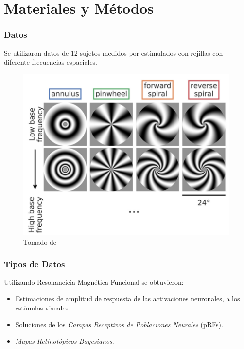 \documentclass[
11pt, %
%
aspectratio=169, %
]{beamer}
\begin{document}
	\section{Materiales y M\'etodos}
	\begin{frame}
		\frametitle{Datos}
		
		
		Se utilizaron datos de 12 sujetos medidos por \cite{broderick_mapping_2022} estimulados con rejillas con diferente frecuencias espaciales.
			
		
	
		\begin{figure}
			\centering
			\captionsetup{font=tiny}
			\includegraphics[scale=0.65]{Graphics/stimulus}
			\caption{Tomado de \cite{broderick_mapping_2022}}
		\end{figure}
		
		
		
	\end{frame}
	
	
	\begin{frame}
		\frametitle{Tipos de Datos}
		
		Utilizando Resonancicia Magn\'etica Funcional se obtuvieron:
		\begin{itemize}
			\item Estimaciones de amplitud de respuesta de las activaciones neuronales, a los est\'imulos visuales.
			\item Soluciones de los \textit{Campos Receptivos de Poblaciones Neurales} (pRFs).
			\item \textit{Mapas Retinot\'opicos Bayesianos}.
			
		\end{itemize}	
		
	\end{frame}
\end{document}
